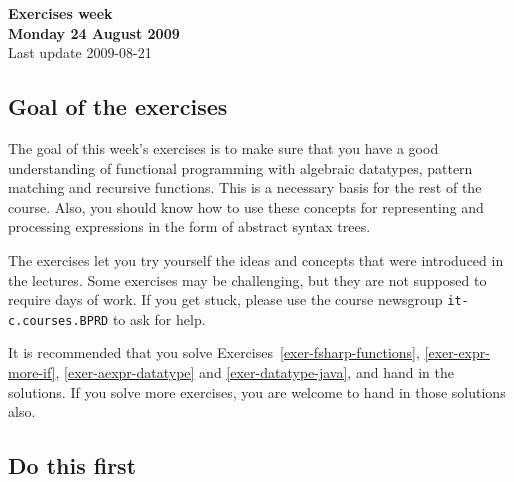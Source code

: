 \documentclass[a4paper]{article}
\begin{document}
\begin{center}
{\Large\bf Exercises week \\[1ex]
Monday 24 August 2009}\\[1ex]
{\small Last update 2009-08-21}\\[2ex]
\end{center}

\subsection*{Goal of the exercises}

The goal of this week's exercises is to make sure that you have a good
understanding of functional programming with algebraic datatypes,
pattern matching and recursive functions.  This is a necessary basis
for the rest of the course.  Also, you should know how to use these
concepts for representing and processing expressions in the form of
abstract syntax trees.


  
  


The exercises let you try yourself the ideas and concepts that were
introduced in the lectures.  Some exercises may be challenging, but
they are not supposed to require days of work.  If you get stuck,
please use the course newsgroup \texttt{it-c.courses.BPRD} to ask for
help.

It is recommended that you solve
Exercises~\ref{exer-fsharp-functions}, \ref{exer-expr-more-if},
\ref{exer-aexpr-datatype} and \ref{exer-datatype-java}, and hand in
the solutions.  If you solve more exercises, you are welcome to hand
in those solutions also.


\subsection*{Do this first}
\end{document}
